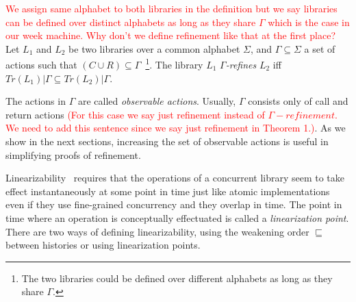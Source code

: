 \begin{dfn}
\textcolor{red}{We assign same alphabet to both libraries in the definition but we say libraries can be defined over distinct alphabets as long as they share $\Gamma$ which is the case in our week machine. Why don't we define refinement like that at the first place?}
Let $L_1$ and $L_2$ be two libraries over a common alphabet $\Sigma$, and $\Gamma\subseteq \Sigma$ a set of actions such that $(C\cup R)\subseteq \Gamma$~\footnote{The two libraries could be defined over different alphabets as long as they share $\Gamma$.}. 
The library $L_1$ \emph{$\Gamma$-refines} $L_2$ if{f} $Tr(L_1) | \Gamma \subseteq Tr(L_2) | \Gamma$.
\end{dfn}
The actions in $\Gamma$ are called \emph{observable actions}. Usually, $\Gamma$ consists only of call and return actions \textcolor{red}{(For this case we say just refinement instead of $\Gamma-refinement$. We need to add this sentence since we say just refinement in Theorem 1.)}. As we show in the next sections, increasing the set of observable actions is useful in simplifying proofs of refinement.

Linearizability~\cite{journals/toplas/HerlihyW90} requires that 
the operations of a concurrent library seem to take effect instantaneously at some point in time just like atomic
implementations even if they use fine-grained concurrency and they overlap in time. The point in time
where an operation is conceptually effectuated is called a \emph{linearization point}. There are two ways of
defining linearizability, using the weakening order $\sqsubseteq$ between histories or using linearization points.

